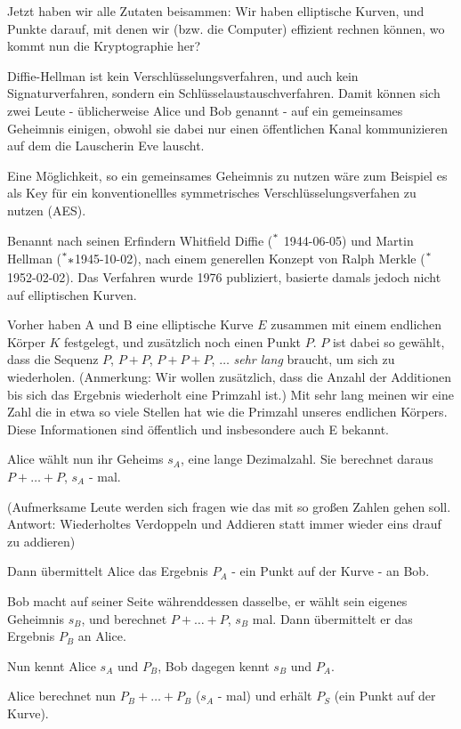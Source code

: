 \documentclass{article}
\begin{document}
Jetzt haben wir alle Zutaten beisammen: Wir haben elliptische Kurven, und
Punkte darauf, mit denen wir (bzw. die Computer) effizient rechnen können, wo
kommt nun die Kryptographie her?

Diffie-Hellman ist kein Verschlüsselungsverfahren, und auch kein
Signaturverfahren, sondern ein Schlüsselaustauschverfahren.  Damit können sich
zwei Leute - üblicherweise Alice und Bob genannt - auf ein gemeinsames
Geheimnis einigen, obwohl sie dabei nur einen öffentlichen Kanal kommunizieren
auf dem die Lauscherin Eve lauscht.

Eine Möglichkeit, so ein gemeinsames Geheimnis zu nutzen wäre zum
Beispiel es als Key für ein konventionellles symmetrisches
Verschlüsselungsverfahen zu nutzen (AES).

Benannt nach seinen Erfindern Whitfield Diffie ($\strut^*$ 1944-06-05) und Martin
Hellman ($\strut^**$1945-10-02), nach einem generellen Konzept von Ralph
Merkle ($\strut^*$1952-02-02). Das Verfahren wurde 1976 publiziert, basierte
damals jedoch nicht auf elliptischen Kurven.

Vorher haben A und B eine elliptische Kurve $E$ zusammen mit einem
endlichen Körper $K$ festgelegt, und zusätzlich noch einen Punkt $P$. $P$
ist dabei so gewählt, dass die Sequenz $P$, $P+P$, $P+P+P$, $\ldots$
\emph{sehr lang}
braucht, um sich zu wiederholen. (Anmerkung: Wir wollen zusätzlich, dass die
Anzahl der Additionen bis sich das Ergebnis wiederholt eine Primzahl ist.) Mit
sehr lang meinen wir eine Zahl die in etwa so viele Stellen hat wie die Primzahl
unseres endlichen Körpers. Diese Informationen sind öffentlich
und insbesondere auch E bekannt.

Alice wählt nun ihr Geheims $s_A$, eine lange Dezimalzahl. Sie berechnet
daraus $P + \ldots + P$, $s_A$ - mal.

(Aufmerksame Leute werden sich fragen wie das mit so großen Zahlen
gehen soll. Antwort: Wiederholtes Verdoppeln und Addieren statt immer wieder
eins drauf zu addieren)

Dann übermittelt Alice das Ergebnis $P_A$ - ein Punkt auf der Kurve - an
Bob.

Bob macht auf seiner Seite währenddessen dasselbe, er wählt sein
eigenes Geheimnis $s_B$, und berechnet $P + \ldots + P$, $s_B$ mal. Dann
übermittelt er das Ergebnis $P_B$ an Alice.

Nun kennt Alice $s_A$ und $P_B$, Bob dagegen kennt $s_B$ und $P_A$.

Alice berechnet nun $P_B + \ldots + P_B$ ($s_A$ - mal) und erhält $P_S$ (ein
Punkt auf der Kurve).
\end{document}
